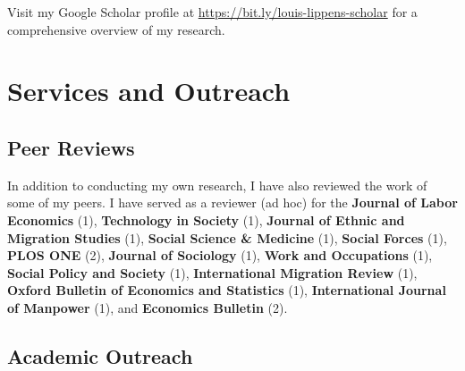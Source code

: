 \documentclass[11pt,a4paper,]{awesome-cv}
\begin{document}
\scriptsize

Visit my Google Scholar profile at
\url{https://bit.ly/louis-lippens-scholar} for a comprehensive overview
of my research. \normalsize

\hypertarget{services-and-outreach}{%
\section{Services and Outreach}\label{services-and-outreach}}

\medskip

\hypertarget{peer-reviews}{%
\subsection{Peer Reviews}\label{peer-reviews}}

\footnotesize

In addition to conducting my own research, I have also reviewed the work
of some of my peers. I have served as a reviewer (ad hoc) for the
\textbf{Journal of Labor Economics} (1), \textbf{Technology in Society}
(1), \textbf{Journal of Ethnic and Migration Studies} (1),
\textbf{Social Science \& Medicine} (1), \textbf{Social Forces} (1),
\textbf{PLOS ONE} (2), \textbf{Journal of Sociology} (1), \textbf{Work
and Occupations} (1), \textbf{Social Policy and Society} (1),
\textbf{International Migration Review} (1), \textbf{Oxford Bulletin of
Economics and Statistics} (1), \textbf{International Journal of
Manpower} (1), and \textbf{Economics Bulletin} (2). \normalsize

\medskip

\hypertarget{academic-outreach}{%
\subsection{Academic Outreach}\label{academic-outreach}}
\end{document}
